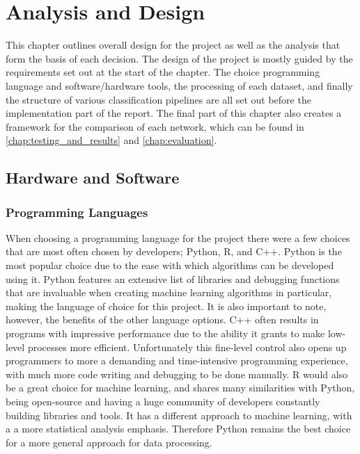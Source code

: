 \chapter{Analysis and Design} \label{chap:analysis_and_design}

This chapter outlines overall design for the project as well as the analysis that form the basis of each decision. The design of the project is mostly guided by the requirements set out at the start of the chapter. The choice programming language and software/hardware tools, the processing of each dataset, and finally the structure of various classification pipelines are all set out before the implementation part of the report. The final part of this chapter also creates a framework for the comparison of each network, which can be found in \cref{chap:testing_and_results} and \cref{chap:evaluation}.

\section{Hardware and Software}

\subsection{Programming Languages}

When choosing a programming language for the project there were a few choices that are most often chosen by developers; Python\cite{Python}, R\cite{R}, and C++\cite{C++}. Python is the most popular choice due to the ease with which algorithms can be developed using it. Python features an extensive list of libraries and debugging functions that are invaluable when creating machine learning algorithms in particular, making the language of choice for this project. It is also important to note, however, the benefits of the other language options. C++ often results in programs with impressive performance due to the ability it grants to make low-level processes more efficient. Unfortunately this fine-level control also opens up programmers to more a demanding and time-intensive programming experience, with much more code writing and debugging to be done manually. R would also be a great choice for machine learning, and shares many similarities with Python, being open-source and having a huge community of developers constantly building libraries and tools. It has a different approach to machine learning, with a a more statistical analysis emphasis. Therefore Python remains the best choice for a more general approach for data processing.

